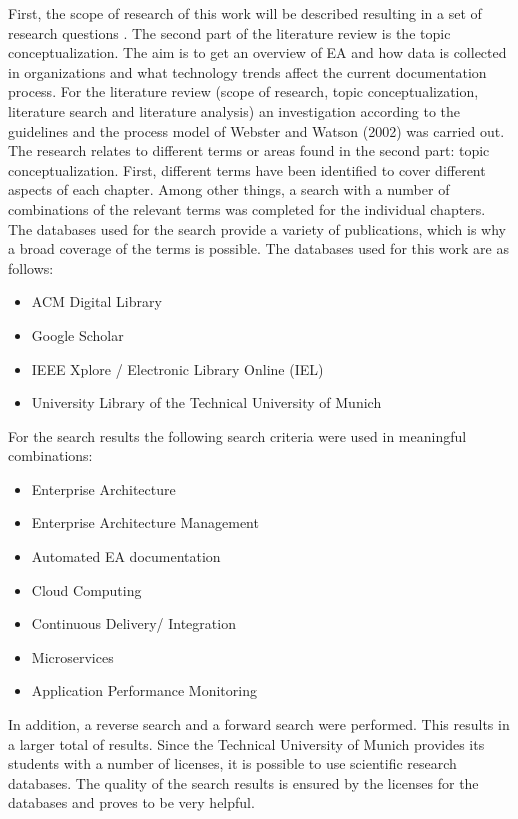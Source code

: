 First, the scope of research of this work will be described resulting in a set of research questions . The second part of the literature review is the topic conceptualization. The aim is to get an overview of EA and how data is collected in organizations and what technology trends affect the current documentation process. 
For the literature review (scope of research, topic conceptualization, literature search and literature analysis) an investigation according to the guidelines and the process model of Webster and Watson (2002) was carried out. \cite{Webster2002} The research relates to different terms or areas found in the second part: topic conceptualization. First, different terms have been identified to cover different aspects of each chapter. Among other things, a search with a number of combinations of the relevant terms was completed for the individual chapters.
The databases used for the search provide a variety of publications, which is why a broad coverage of the terms is possible. The databases used for this work are as follows:

\begin{itemize}
    \item ACM Digital Library
    \item Google Scholar
    \item IEEE Xplore / Electronic Library Online (IEL)
    \item University Library of the Technical University of Munich
\end{itemize}

For the search results the following search criteria were used in meaningful combinations:

\begin{itemize}
    \item Enterprise Architecture
    \item Enterprise Architecture Management
    \item Automated EA documentation
    \item Cloud Computing
    \item Continuous Delivery/ Integration
    \item Microservices
    \item Application Performance Monitoring
\end{itemize}

In addition, a reverse search and a forward search were performed. This results in a larger total of results. Since the Technical University of Munich provides its students with a number of licenses, it is possible to use scientific research databases. The quality of the search results is ensured by the licenses for the databases and proves to be very helpful.

